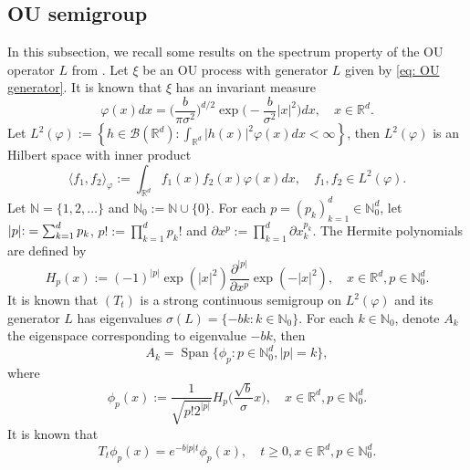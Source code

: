 \documentclass[12pt,oneside,english]{amsart}
\theoremstyle{plain}
\theoremstyle{definition}
\numberwithin{equation}{section}
\newcommand{\added}[1]{{\color{blue}#1}}\newcommand{\deleted}[1]{{\color{red}#1}}
\begin{document}
\subsection{OU semigroup}
    In this subsection, we recall some results on the spectrum property of the OU operator $L$ from \cite{GD}.
    Let $\xi$ be an OU process with generator $L$ given by \eqref{eq: OU generator}.
    It is known that $\xi$ has an invariant measure
\begin{equation}
\label{invariantdensity}
    \varphi(x)dx
    =\Big (\frac{b}{\pi \sigma^2}\Big )^{d/2}\exp \Big(-\frac{b}{\sigma^2}|x|^2 \Big)dx,
    \quad x\in \mathbb{R}^d.
\end{equation}
    Let $L^2(\varphi):= \left\{ h  \in \mathscr B(\mathbb R^d): \int_{\mathbb{R}^d} |h(x)|^2 \varphi(x) dx < \infty \right\}$, then $L^2(\varphi)$ is an Hilbert space with inner product
\begin{equation}
    \langle f_1, f_2 \rangle_{\varphi}
    := \int_{\mathbb{R}^d}f_1(x)f_2(x)\varphi(x) dx, \quad f_1,f_2 \in L^2(\varphi).
\end{equation}
     Let $\mathbb N = \{1,2,\dots\}$ and $\mathbb N_0 := \mathbb N\cup\{0\}$.
    For each $p = (p_k)_{k = 1}^d \in \mathbb{N}_0^{d}$, let $|p| \added{ :}=\sum_{k=1}^d p_k$, $p!:= \prod_{k= 1}^d p_k !$ and $\partial x^p:= \prod_{k = 1}^d\partial x_k^{p_k}$.
    The Hermite polynomials are defined by
\begin{equation}
    H_p(x)
    :=(-1)^{|p|}\exp(|x|^2) \frac{\partial ^{|p|}}{\partial x^p} \exp(-|x|^2) ,
    \quad x\in \mathbb R^d, p \in \mathbb{N}_0^{d}.
\end{equation}
    It is known that $(T_t)$ is a strong continuous semigroup on $L^2(\varphi)$ and its generator $L$ has eigenvalues $\sigma(L)= \{-bk: k \in \mathbb N_0\}$.
    For each $k \in \mathbb N_0$, denote $A_k$ the eigenspace corresponding to eigenvalue $-bk$, then
\begin{equation}
    A_k
    = \operatorname{Span} \{\phi_p : p\in \mathbb N_0^d, |p|=k\},
\end{equation}
where
\begin{equation}\label{eigenfunction}
    \phi_p(x)
    := \frac{1}{\sqrt{ p! 2^{|p|} }} H_p \Big(\frac{ \sqrt{b} }{\sigma}x \Big),
    \quad x\in \mathbb{R}^d, p\in \mathbb N_0^d.
\end{equation}
    It is known that
\begin{equation}\label{semigroupformula}
    T_t\phi_p(x)
    =e^{-b|p|t}\phi_p(x),
    \quad t\geq 0, x\in \mathbb{R}^d, p\in \mathbb N_0^d.
\end{equation}
\end{document}
